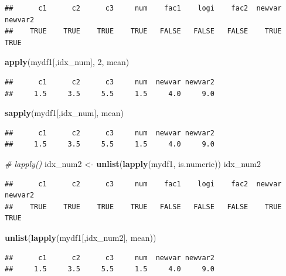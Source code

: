 \documentclass[]{book}
\newenvironment{Shaded}{\begin{snugshade}}{\end{snugshade}}
\newcommand{\KeywordTok}[1]{\textcolor[rgb]{0.13,0.29,0.53}{\textbf{{#1}}}}
\newcommand{\DecValTok}[1]{\textcolor[rgb]{0.00,0.00,0.81}{{#1}}}
\newcommand{\StringTok}[1]{\textcolor[rgb]{0.31,0.60,0.02}{{#1}}}
\newcommand{\CommentTok}[1]{\textcolor[rgb]{0.56,0.35,0.01}{\textit{{#1}}}}
\newcommand{\NormalTok}[1]{{#1}}
\theoremstyle{definition}
\theoremstyle{definition}
\theoremstyle{remark}
\begin{document}
\begin{verbatim}
##      c1      c2      c3     num    fac1    logi    fac2  newvar newvar2 
##    TRUE    TRUE    TRUE    TRUE   FALSE   FALSE   FALSE    TRUE    TRUE
\end{verbatim}

\begin{Shaded}
\begin{Highlighting}[]
\KeywordTok{apply}\NormalTok{(mydf1[,idx_num], }\DecValTok{2}\NormalTok{, mean)}
\end{Highlighting}
\end{Shaded}

\begin{verbatim}
##      c1      c2      c3     num  newvar newvar2 
##     1.5     3.5     5.5     1.5     4.0     9.0
\end{verbatim}

\begin{Shaded}
\begin{Highlighting}[]
\KeywordTok{sapply}\NormalTok{(mydf1[,idx_num], mean)}
\end{Highlighting}
\end{Shaded}

\begin{verbatim}
##      c1      c2      c3     num  newvar newvar2 
##     1.5     3.5     5.5     1.5     4.0     9.0
\end{verbatim}

\begin{Shaded}
\begin{Highlighting}[]
\CommentTok{# lapply() }
\NormalTok{idx_num2 <-}\StringTok{ }\KeywordTok{unlist}\NormalTok{(}\KeywordTok{lapply}\NormalTok{(mydf1, is.numeric)) }
\NormalTok{idx_num2}
\end{Highlighting}
\end{Shaded}

\begin{verbatim}
##      c1      c2      c3     num    fac1    logi    fac2  newvar newvar2 
##    TRUE    TRUE    TRUE    TRUE   FALSE   FALSE   FALSE    TRUE    TRUE
\end{verbatim}

\begin{Shaded}
\begin{Highlighting}[]
\KeywordTok{unlist}\NormalTok{(}\KeywordTok{lapply}\NormalTok{(mydf1[,idx_num2], mean))}
\end{Highlighting}
\end{Shaded}

\begin{verbatim}
##      c1      c2      c3     num  newvar newvar2 
##     1.5     3.5     5.5     1.5     4.0     9.0
\end{verbatim}
\end{document}
